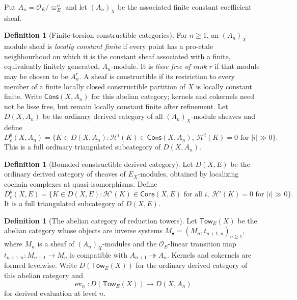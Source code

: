 \documentclass[10pt]{article}
\theoremstyle{definition}
\newtheorem{definition}[theorem]{Definition}
\newcommand{\Dbc}{D^b_c}
\begin{document}
Put \(A_n=\mathcal O_E/\varpi_E^n\) and let \((A_n)_X\) be the associated
finite constant coefficient sheaf.

\begin{definition}[Finite-torsion constructible categories]
For \(n\ge1\), an \((A_n)_X\)-module sheaf is \emph{locally constant
finite} if every point has a pro-etale neighbourhood on which it is the
constant sheaf associated with a finite, equivalently finitely generated,
\(A_n\)-module.  It is \emph{lisse free of rank \(r\)} if that module may
be chosen to be \(A_n^r\).  A sheaf is constructible if its restriction to
every member of a finite locally closed constructible partition of \(X\)
is locally constant finite.  Write \(\mathsf{Cons}(X,A_n)\) for this
abelian category; kernels and cokernels need not be lisse free, but remain
locally constant finite after refinement.  Let \(D(X,A_n)\) be the ordinary
derived category of all \((A_n)_X\)-module sheaves and define
\[
 D^b_c(X,A_n)=
 \{K\in D(X,A_n):\mathcal H^i(K)\in\mathsf{Cons}(X,A_n),
          \ \mathcal H^i(K)=0\text{ for }|i|\gg0\}.
\]
This is a full ordinary triangulated subcategory of \(D(X,A_n)\).
\end{definition}

\begin{definition}[Bounded constructible derived category]
Let \(D(X,E)\) be the ordinary derived category of sheaves of
\(E_X\)-modules, obtained by localizing cochain complexes at
quasi-isomorphisms.  Define
\[
 \Dbc(X,E)=
 \{K\in D(X,E):\mathcal H^i(K)\in\mathsf{Cons}(X,E)
       \text{ for all }i,\ \mathcal H^i(K)=0\text{ for }|i|\gg0\}.
\]
It is a full triangulated subcategory of \(D(X,E)\).
\end{definition}

\begin{definition}[The abelian category of reduction towers]
Let \(\mathsf{Tow}_E(X)\) be the abelian category whose objects are
inverse systems \(M_\bullet=(M_n,t_{n+1,n})_{n\ge1}\), where \(M_n\) is a
sheaf of \((A_n)_X\)-modules and the \(\mathcal O_E\)-linear transition
map \(t_{n+1,n}:M_{n+1}\to M_n\) is compatible with
\(A_{n+1}\twoheadrightarrow A_n\).  Kernels and cokernels are formed
levelwise.  Write \(D(\mathsf{Tow}_E(X))\) for the ordinary derived
category of this abelian category and
\[
             \operatorname{ev}_n:D(\mathsf{Tow}_E(X))
                    \longrightarrow D(X,A_n)
\]
for derived evaluation at level \(n\).
\end{definition}
\end{document}
